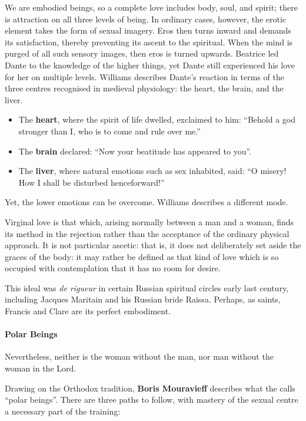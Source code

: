 We are embodied beings, so a complete love includes body, soul, and spirit; there is attraction on all three levels of being. In ordinary cases, however, the erotic element takes the form of sexual imagery. Eros then turns inward and demands its satisfaction, thereby preventing its ascent to the spiritual. When the mind is purged of all such sensory images, then eros is turned upwards. Beatrice led Dante to the knowledge of the higher things, yet Dante still experienced his love for her on multiple levels. Williams describes Dante's reaction in terms of the three centres recognised in medieval physiology: the heart, the brain, and the liver.

\begin{itemize}
\item The \textbf{heart}, where the spirit of life dwelled, exclaimed to him: “Behold a god stronger than I, who is to come and rule over me.” 
\item The \textbf{brain} declared: “Now your beatitude has appeared to you”. 
\item The \textbf{liver}, where natural emotions such as sex inhabited, said: “O misery! How I shall be disturbed henceforward!”
\end{itemize}
Yet, the lower emotions can be overcome. Williams describes a different mode.

\begin{quotex}
Virginal love is that which, arising normally between a man and a woman, finds its method in the rejection rather than the acceptance of the ordinary physical approach. It is not particular ascetic: that is, it does not deliberately set aside the graces of the body: it may rather be defined as that kind of love which is so occupied with contemplation that it has no room for desire. 

\end{quotex}
This ideal was \emph{de rigueur} in certain Russian spiritual circles early last century, including Jacques Maritain and his Russian bride Raissa. Perhaps, as saints, Francis and Clare are its perfect embodiment.

\paragraph{Polar Beings}
\begin{quotex}
Nevertheless, neither is the woman without the man, nor man without the woman in the Lord. 

\end{quotex}
Drawing on the Orthodox tradition, \textbf{Boris Mouravieff} describes what the calls “polar beings”. There are three paths to follow, with mastery of the sexual centre a necessary part of the training:

